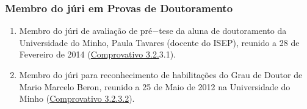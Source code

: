 \documentclass[11pt]{article}
\begin{document}
\subsubsection{Membro do júri em Provas de Doutoramento}
\begin{enumerate}
\item {Membro do júri de avaliação de pré$-$tese da aluna de doutoramento da Universidade do Minho, Paula Tavares (docente do ISEP), reunido a 28 de Fevereiro de 2014 (\href{run:JuriProvas/ArguentePaulaTavares.pdf}{Comprovativo 3.2.}3.1).}
\item {Membro do júri para reconhecimento de habilitações do Grau de Doutor de Mario Marcelo Beron, reunido a 25 de Maio de 2012 na Universidade do Minho (\href{run:JuriProvas/RecMarioBeron.pdf}{Comprovativo 3.2.3.2}).}
\end{enumerate}
\end{document}
